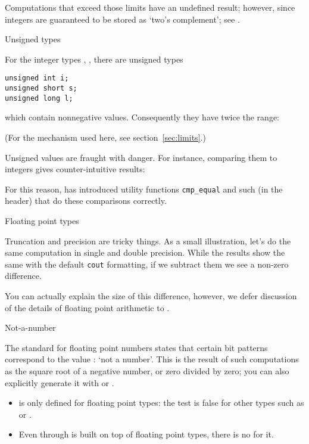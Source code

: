 Computations that exceed those limits have an undefined result;
however, since  integers are guaranteed to be stored as
`two's complement'; see .

 {Unsigned types}
\label{sec:unsigned-cmp}

For the integer types , , 
there are unsigned types
\begin{lstlisting}
unsigned int i;
unsigned short s;
unsigned long l;
\end{lstlisting}
which contain nonnegative values.
Consequently they have twice the range:
%

(For the mechanism used here, see section~\ref{sec:limits}.)

Unsigned values are fraught with danger. For instance,
comparing them to integers gives counter-intuitive results:
%

For this reason,  has introduced utility functions
\lstinline+cmp_equal+ and such (in the  header)
that do these comparisons correctly.

 {Floating point types}

Truncation and precision are tricky things.
As a small illustration, let's do the same computation
in single and double precision.
While the results show the same with the default \lstinline{cout}
formatting,
if we subtract them we see a non-zero difference.


You can actually explain the size of this difference,
however, we defer discussion of the details
of floating point arithmetic to
.

 {Not-a-number}
\label{sec:naninf}

The  standard for floating point numbers
states that certain bit patterns correspond to the value
: `not a number'.
This is the result of such computations as the square root
of a negative number, or zero divided by zero;
you can also explicitly generate it
with  or .

\begin{itemize}
\item {} is only defined for floating point types:
  the test  is false for other types
  such as  or .
\item Even through  is built on top of
  floating point types, there is no  for it.
\end{itemize}

